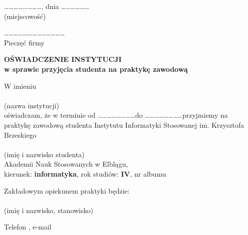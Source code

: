 \documentclass[11pt,a4paper]{article}
\begin{document}
\begin{flushright}
    \dots\dots\dots\dots\dots\dots\dots\dots, dnia \dots\dots\dots\dots\dots\dots \\
    {\small (miejscowość)}
\end{flushright}

\vspace{2em}

\begin{flushleft}
    \dots\dots\dots\dots\dots\dots\dots\dots\dots\dots\dots\dots\dots \\
    {\small Pieczęć firmy}
\end{flushleft}

\vspace{3em}

\begin{center}
    \textbf{\large OŚWIADCZENIE INSTYTUCJI} \\[0.5em]
    \textbf{w sprawie przyjęcia studenta na praktykę zawodową}
\end{center}

\vspace{3em}

\noindent W imieniu \dotfill \\
\dotfill \\
{\small (nazwa instytucji)} \\
oświadczam, że w terminie od \dots\dots\dots\dots\dots\dots\dots\dots do \dots\dots\dots\dots\dots\dots\dots\dots przyjmiemy na praktykę zawodową studenta Instytutu Informatyki Stosowanej im. Krzysztofa Brzeskiego \\[1em]
\dotfill \\
{\small (imię i nazwisko studenta)} \\
Akademii Nauk Stosowanych w Elblągu, \\
kierunek: \textbf{informatyka}, \hspace{1cm} rok studiów: \textbf{IV}, \hspace{1cm} nr albumu \dotfill

\vspace{2em}

\noindent Zakładowym opiekunem praktyki będzie: \\[1em]
\dotfill \\
{\small (imię i nazwisko, stanowisko)}

\vspace{1.5em}

\noindent Telefon \dotfill, e-mail \dotfill

\vspace{2em}
\end{document}
